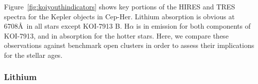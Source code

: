 \documentclass[12pt,twocolumn,tighten,linenumbers,trackchanges]{aastex63}
\begin{document}
Figure~\ref{fig:koiyouthindicators} shows key portions of the HIRES
and TRES spectra for the Kepler objects in Cep-Her.  Lithium
absorption is obvious at 6708\AA\ in all stars except KOI-7913 B.  
H$\alpha$ is in emission for both components of
KOI-7913, and in absorption for the hotter stars.  Here, we compare
these observations against benchmark open clusters in order to
assess their implications for the stellar ages.

\subsubsection{Lithium}

\begin{figure}[tp]
	\begin{center}
		\leavevmode
	
		\vspace{-0.35cm}
	

\end{center}
\end{figure}
\end{document}
